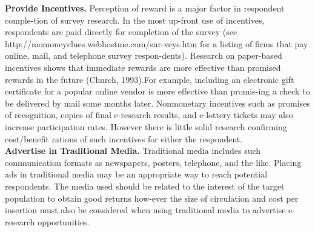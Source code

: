 \documentclass[a4,9pt]{beamer}
\begin{document}
\begin{frame}
\small{
\textbf{Provide Incentives.} \hspace*{0.2cm} Perception of reward is a major factor in respondent comple-tion of survey research. In the most up-front use of incentives, respondents are paid directly for completion of the survey (see http://momoneyclues.webhostme.com/sur-veys.htm for a listing of firms that pay online, mail, and telephone survey respon-dents). Research on paper-based incentives shows that immediate rewards are more effective than promised rewards in the future (Church, 1993).For example, including an electronic gift certificate for a popular online vendor is more  effective than promis-ing a check to be delivered by mail some months later. Nonmonetary incentives such as promises of recognition, copies of final e-research results, and e-lottery tickets may also increase participation rates. However there is little solid research confirming cost/benefit rations of such incentives for either the respondent.\\

 \vspace*{0.3cm}
\textbf{Advertise in Traditional Media.}  \hspace*{0.2cm} Traditional media includes such communication formats as newspapers, posters, telephone, and the like. Placing ads in traditional media may be an appropriate way to reach potential respondents. The media used should be related to the interest of the target population to obtain good returns how-ever the size of circulation and cost per insertion must also be considered when using traditional media to advertise e-research opportunities.}\\
\end{frame}
\end{document}
